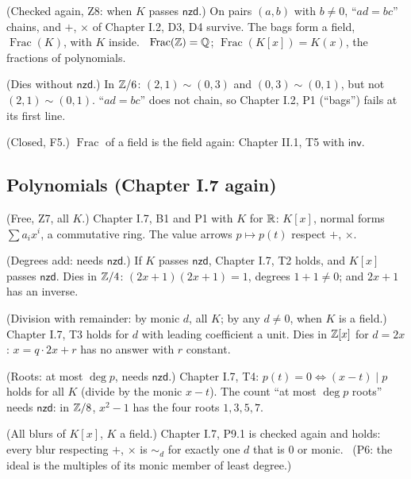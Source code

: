 \begin{lines}
\item[\lab{P1}] (Checked again, Z8: when $K$ passes $\mathsf{nzd}$.) On pairs $(a, b)$ with $b \ne 0$, ``$ad = bc$'' chains, and $+$, $\times$ of Chapter I.2, D3, D4 survive. The bags form a field, $\operatorname{Frac}(K)$, with $K$ inside. \ $\operatorname{Frac}(\mathbb{Z}) = \mathbb{Q}$; $\operatorname{Frac}(K[x]) = K(x)$, the fractions of polynomials.
\item[\lab{P2}] (Dies without $\mathsf{nzd}$.) In $\mathbb{Z}/6$: $(2, 1) \sim (0, 3)$ and $(0, 3) \sim (0, 1)$, but not $(2, 1) \sim (0, 1)$. ``$ad = bc$'' does not chain, so Chapter I.2, P1 (``bags'') fails at its first line.
\item[\lab{P3}] (Closed, F5.) $\operatorname{Frac}$ of a field is the field again: Chapter II.1, T5 with $\mathsf{inv}$.
\end{lines}

\subsection*{Polynomials (Chapter I.7 again)}

\begin{lines}
\item[\lab{P4}] (Free, Z7, all $K$.) Chapter I.7, B1 and P1 with $K$ for $\mathbb{R}$: $K[x]$, normal forms $\sum a_i x^i$, a commutative ring. The value arrows $p \mapsto p(t)$ respect $+$, $\times$.
\item[\lab{P5}] (Degrees add: needs $\mathsf{nzd}$.) If $K$ passes $\mathsf{nzd}$, Chapter I.7, T2 holds, and $K[x]$ passes $\mathsf{nzd}$. Dies in $\mathbb{Z}/4$: $(2x + 1)(2x + 1) = 1$, degrees $1 + 1 \ne 0$; and $2x + 1$ has an inverse.
\item[\lab{P6}] (Division with remainder: by monic $d$, all $K$; by any $d \ne 0$, when $K$ is a field.) Chapter I.7, T3 holds for $d$ with leading coefficient a unit. Dies in $\mathbb{Z}[x]$ for $d = 2x$: $x = q \cdot 2x + r$ has no answer with $r$ constant.
\item[\lab{P7}] (Roots: at most $\deg p$, needs $\mathsf{nzd}$.) Chapter I.7, T4: $p(t) = 0 \iff (x - t) \mid p$ holds for all $K$ (divide by the monic $x - t$). The count ``at most $\deg p$ roots'' needs $\mathsf{nzd}$: in $\mathbb{Z}/8$, $x^2 - 1$ has the four roots $1, 3, 5, 7$.
\item[\lab{P8}] (All blurs of $K[x]$, $K$ a field.) Chapter I.7, P9.1 is checked again and holds: every blur respecting $+$, $\times$ is $\sim_d$ for exactly one $d$ that is $0$ or monic. \ (P6: the ideal is the multiples of its monic member of least degree.)
\end{lines}

